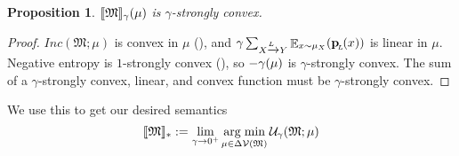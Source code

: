 \documentclass{article}
\theoremstyle{plain}
\newtheorem{prop}[theorem]{Proposition}
\theoremstyle{definition}
\theoremstyle{remark}
\DeclarePairedDelimiter{\bbr}{\llbracket}{\rrbracket}
\let\H\relax
\DeclareMathOperator{\H}{\mathrm{H}} %
\DeclareMathOperator*{\E}{\mathbb{E}} %
\DeclareMathOperator*{\argmin}{arg\;min}
\newcommand\mat[1]{\mathbf{#1}}
\newcommand{\bp}[1][L]{\mat{p}_{\!_{#1}\!}}
\newcommand{\V}{\mathcal V}
\newcommand{\dg}[1]{\mathfrak{#1}}
\newcommand\inco{\mathit{Inc}}
\newcommand{\ed}[3]{#2 \xrightarrow{\!\!\smash{#1}\vphantom{g}} #3}
\newcommand{\alle}[1][L]{_{ \ed {#1}XY}}
\numberwithin{equation}{section}
\begin{document}
    \begin{prop}\label{prop:u-convex}
$\bbr{\dg M}_\gamma(\mu)$ is $\gamma$-strongly convex.%

    \end{prop}
    \begin{proof}
		$\inco(\dg M; \mu)$ is convex in $\mu$  (), and $\gamma\sum\alle \E_{x\sim \mu_X} \H(\bp(x))$ is linear in $\mu$. 
		Negative entropy is $1$-strongly convex
		(), so $- \gamma \H(\mu)$ is $\gamma$-strongly convex.
		The sum of a $\gamma$-strongly convex, linear, and convex function must be $\gamma$-strongly convex.
	\end{proof}
	We use this to get our desired semantics
	\begin{equation}
		 \bbr{\dg M}_* := \lim_{\gamma\to 0^+}\argmin_{\mu \in \Delta\V(\dg M)} \mathcal U_\gamma(\dg M;\mu)
			\label{eq:uniqdist}
	\end{equation}
\end{document}
